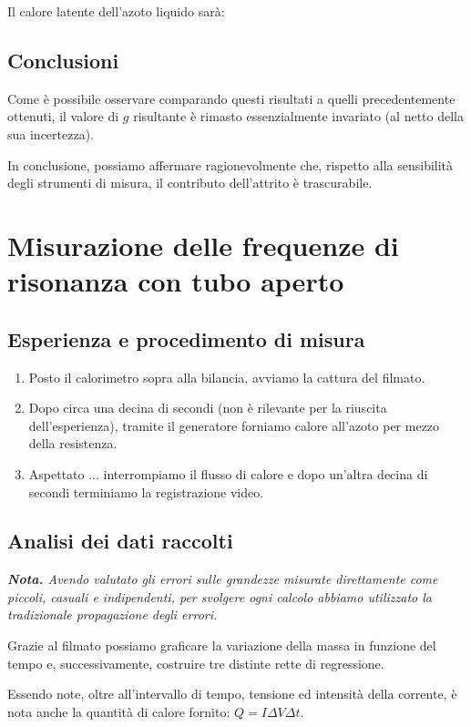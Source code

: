 \documentclass{article}
\begin{document}
  Il calore latente dell'azoto liquido sarà:

\subsection{Conclusioni}

Come è possibile osservare comparando questi risultati a
quelli precedentemente ottenuti, il valore di $g$ risultante
è rimasto essenzialmente invariato (al netto della sua incertezza).

In conclusione, possiamo affermare ragionevolmente che,
rispetto alla sensibilità degli strumenti di misura,
il contributo dell'attrito è trascurabile.

\section{Misurazione delle frequenze di risonanza con tubo aperto}

\subsection{Esperienza e procedimento di misura}

\begin{enumerate}
  \item
    Posto il calorimetro sopra alla bilancia, avviamo la cattura del filmato.
  \item
    Dopo circa una decina di secondi (non è rilevante per la riuscita dell'esperienza),
    tramite il generatore forniamo calore all'azoto per mezzo della resistenza.
  \item
    Aspettato ... interrompiamo il flusso di calore e dopo
    un'altra decina di secondi terminiamo la registrazione video.
\end{enumerate}

\subsection{Analisi dei dati raccolti}
\emph{\textbf{Nota.}
Avendo valutato gli errori sulle grandezze misurate direttamente
come piccoli, casuali e indipendenti, per svolgere ogni calcolo
abbiamo utilizzato la tradizionale propagazione degli errori.
}

  Grazie al filmato possiamo graficare la variazione della massa in funzione del tempo
  e, successivamente, costruire tre distinte rette di regressione.

  Essendo note, oltre all'intervallo di tempo, tensione ed intensità della corrente,
  è nota anche la quantità di calore fornito: $Q = I \Delta V \Delta t$.
\end{document}
